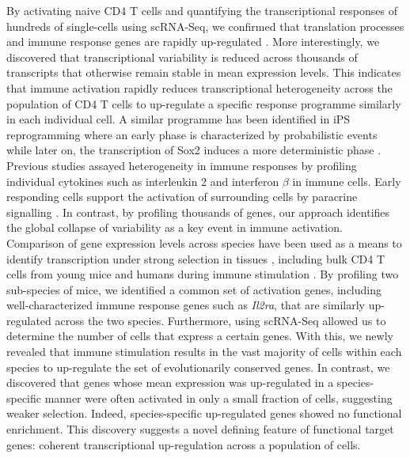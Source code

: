 By activating naive CD4\plus{} T cells and quantifying the transcriptional responses of hundreds of single-cells using scRNA-Seq, we confirmed that translation processes and immune response genes are rapidly up-regulated \citep{Neme2016, Asmal2003,Turner2014, Glass2010, Gerondakis2010, Croft2009}. More interestingly, we discovered that transcriptional variability is reduced across thousands of transcripts that otherwise remain stable in mean expression levels. This indicates that immune activation rapidly reduces transcriptional heterogeneity across the population of CD4\plus{} T cells to up-regulate a specific response programme similarly in each individual cell. A similar programme has been identified in iPS reprogramming where an early phase is characterized by probabilistic events while later on, the transcription of Sox2 induces a  more deterministic phase \citep{Buganim2012}. Previous studies assayed heterogeneity in immune responses by profiling individual cytokines such as interleukin 2 and interferon $\beta$ in immune cells. Early responding cells support the activation of surrounding cells by paracrine signalling \citep{Fuhrmann2016, Shalek2014}. In contrast, by profiling thousands of genes, our approach identifies the global collapse of variability as a key event in immune activation.\\

Comparison of gene expression levels across species have been used as a means to identify transcription under strong selection in tissues \citep{Brawand2011, Sudmant2015, Romero2012, Barbosa-Morais2012, Perry2012}, including bulk CD4\plus{} T cells from young mice and humans during immune stimulation \citep{Shay2013}. By profiling two sub-species of mice, we identified a common set of activation genes, including well-characterized immune response genes such as \textit{Il2ra}, that are similarly up-regulated across the two species. Furthermore, using scRNA-Seq allowed us to determine the number of cells that express a certain genes. With this, we newly revealed that immune stimulation results in the vast majority of cells within each species to up-regulate the set of evolutionarily conserved genes. In contrast, we discovered that genes whose mean expression was up-regulated in a species-specific manner were often activated in only a small fraction of cells, suggesting weaker selection. Indeed, species-specific up-regulated genes showed no functional enrichment. This discovery suggests a novel defining feature of functional target genes: coherent transcriptional up-regulation across a population of cells. \\

